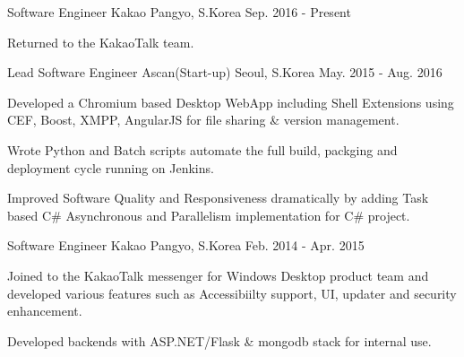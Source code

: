 

\begin{cventries}

  \cventry
    {Software Engineer} %
    {Kakao} %
    {Pangyo, S.Korea} %
    {Sep. 2016 - Present} %
    {
      \begin{cvitems} %
        \item {Returned to the KakaoTalk team. }
      \end{cvitems}
    }


  \cventry
    {Lead Software Engineer} %
    {Ascan(Start-up)} %
    {Seoul, S.Korea} %
    {May. 2015 - Aug. 2016} %
    {
      \begin{cvitems} %
        \item {Developed a Chromium based Desktop WebApp including Shell
    Extensions using CEF, Boost, XMPP, AngularJS for file sharing \& version management.}
        \item {Wrote Python and Batch scripts automate the full build, packging and deployment cycle running on Jenkins.}
        \item {Improved Software Quality and Responsiveness dramatically by adding Task based C\# Asynchronous and Parallelism implementation for C\# project.}
      \end{cvitems}
    }

  \cventry
    {Software Engineer} %
    {Kakao} %
    {Pangyo, S.Korea} %
    {Feb. 2014 - Apr. 2015} %
    {
      \begin{cvitems} %
        \item {Joined to the KakaoTalk messenger for Windows Desktop product team and developed various features such as Accessibiilty support, UI, updater and security enhancement. }
        \item {Developed backends with ASP.NET/Flask \& mongodb stack for internal use.}
      \end{cvitems}
    }


\end{cventries}

